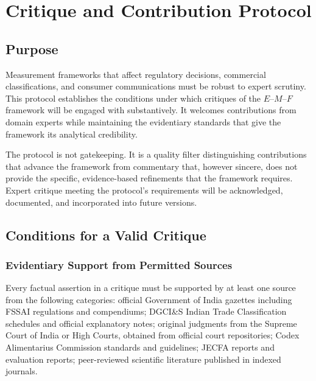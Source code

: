 \documentclass[12pt,a3paper]{article}
\begin{document}
\newpage


\appendix

\section{Critique and Contribution Protocol}
\label{app:critique}

\subsection{Purpose}

Measurement frameworks that affect regulatory decisions, commercial classifications, and consumer communications must be robust to expert scrutiny. This protocol establishes the conditions under which critiques of the $E$--$M$--$F$ framework will be engaged with substantively. It welcomes contributions from domain experts while maintaining the evidentiary standards that give the framework its analytical credibility.

The protocol is not gatekeeping. It is a quality filter distinguishing contributions that advance the framework from commentary that, however sincere, does not provide the specific, evidence-based refinements that the framework requires. Expert critique meeting the protocol's requirements will be acknowledged, documented, and incorporated into future versions.

\subsection{Conditions for a Valid Critique}

\subsubsection{Evidentiary Support from Permitted Sources}

Every factual assertion in a critique must be supported by at least one source from the following categories: official Government of India gazettes including FSSAI regulations and compendiums; DGCI\&S Indian Trade Classification schedules and official explanatory notes; original judgments from the Supreme Court of India or High Courts, obtained from official court repositories; Codex Alimentarius Commission standards and guidelines; JECFA reports and evaluation reports; peer-reviewed scientific literature published in indexed journals.
\end{document}
